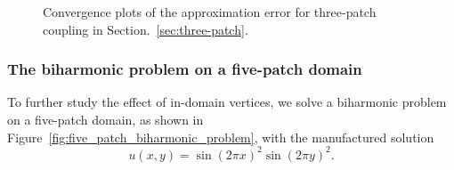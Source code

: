 \begin{figure}[ht]
	\centering
	\begin{subfigure}[b]{0.47\textwidth}
		
	\end{subfigure}
	\hfill
	\begin{subfigure}[b]{0.47\textwidth}
		
	\end{subfigure}
	\caption{Convergence plots of the approximation error for three-patch coupling in Section.~\ref{sec:three-patch}.}\label{fig:three_patch_approximation}
\end{figure}
\FloatBarrier

\subsubsection{The biharmonic problem on a five-patch domain}\label{sec:five-patch}

To further study the effect of in-domain vertices, we solve a biharmonic problem on a five-patch domain, as shown in Figure~\ref{fig:five_patch_biharmonic_problem}, with the manufactured solution
\begin{equation}
	u(x,y)=\sin(2\pi{x})^2\sin(2\pi{y})^2.
\end{equation}

